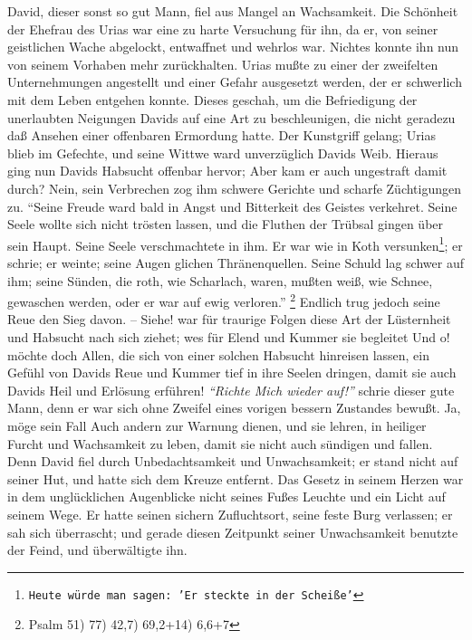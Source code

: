 David, dieser sonst so gut Mann, fiel aus Mangel an Wachsamkeit. Die Schönheit
der Ehefrau des Urias war eine zu harte Versuchung für ihn, da er, von seiner
geistlichen Wache abgelockt, entwaffnet und wehrlos war. Nichtes konnte ihn nun
von seinem Vorhaben mehr zurückhalten. Urias mußte zu einer der zweifelten
Unternehmungen angestellt und einer Gefahr ausgesetzt werden, der er schwerlich
mit dem Leben entgehen konnte. Dieses geschah, um die Befriedigung der
unerlaubten Neigungen Davids auf eine Art zu beschleunigen, die nicht geradezu
daß Ansehen einer offenbaren Ermordung hatte. Der Kunstgriff gelang; Urias blieb
im Gefechte, und seine Wittwe ward unverzüglich Davids Weib. Hieraus ging nun
Davids Habsucht offenbar hervor; Aber kam er auch ungestraft damit durch? Nein,
sein Verbrechen zog ihm schwere Gerichte und scharfe Züchtigungen zu.
"`Seine
Freude ward bald in Angst und Bitterkeit des Geistes verkehret. Seine Seele
wollte sich nicht trösten lassen, und die Fluthen der Trübsal gingen über sein
Haupt. Seine Seele verschmachtete in ihm. Er war wie in Koth versunken\footnote{\texttt{Heute würde man sagen: 'Er steckte in der Scheiße'}}; er schrie; er weinte;
seine Augen glichen Thränenquellen. Seine Schuld lag schwer auf ihm; seine
Sünden, die roth, wie Scharlach, waren, mußten weiß, wie Schnee, gewaschen
werden, oder er war auf ewig verloren."'
\footnote{Psalm 51) 77) 42,7) 69,2+14) 6,6+7}
Endlich trug jedoch seine Reue den Sieg davon. -- Siehe! war für
traurige Folgen diese Art der Lüsternheit und Habsucht nach sich ziehet; wes für
Elend und Kummer sie begleitet Und o! möchte doch Allen, die sich von einer
solchen Habsucht hinreisen lassen, ein Gefühl von Davids Reue und Kummer tief in
ihre Seelen dringen, damit sie auch Davids Heil und Erlösung erführen! \textit{"`Richte
Mich wieder auf!"'} schrie dieser gute Mann, denn er war sich ohne Zweifel eines
vorigen bessern Zustandes bewußt. Ja, möge sein Fall Auch andern zur Warnung
dienen, und sie lehren, in heiliger Furcht und Wachsamkeit zu leben, damit sie
nicht auch sündigen und fallen. Denn David fiel durch Unbedachtsamkeit und
Unwachsamkeit; er stand nicht auf seiner Hut, und hatte sich dem Kreuze
entfernt. Das Gesetz in seinem Herzen war in dem unglücklichen Augenblicke nicht
seines Fußes Leuchte und ein Licht auf seinem Wege. Er hatte seinen sichern
Zufluchtsort, seine feste Burg verlassen; er sah sich überrascht; und gerade
diesen Zeitpunkt seiner Unwachsamkeit benutzte der Feind, und überwältigte ihn.

